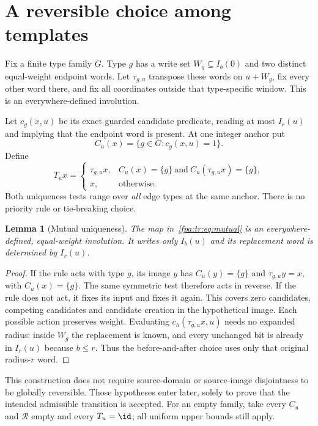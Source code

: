 \documentclass[11pt,a4paper]{article}
\numberwithin{equation}{section}
\newtheorem{lemma}[theorem]{Lemma}
\newcommand{\Rec}{\mathcal R}\newcommand{\Sel}{\mathcal S}
\begin{document}
\section{A reversible choice among templates}\label{fpa:tr:sec:choice}
Fix a finite type family $G$. Type $g$ has a write set $W_g\subseteq I_b(0)$ and two distinct equal-weight endpoint words. Let $\tau_{g,u}$ transpose these words on $u+W_g$, fix every other word there, and fix all coordinates outside that type-specific window. This is an everywhere-defined involution.

Let $c_g(x,u)$ be its exact guarded candidate predicate, reading at most $I_r(u)$ and implying that the endpoint word is present. At one integer anchor put
\[
C_u(x)=\{g\in G:c_g(x,u)=1\}.
\]
Define
\begin{equation}\label{fpa:tr:eq:mutual}
T_u x=\begin{cases}
\tau_{g,u}x,&C_u(x)=\{g\}\ \text{and}\ C_u(\tau_{g,u}x)=\{g\},\\
x,&\text{otherwise}.
\end{cases}
\end{equation}
Both uniqueness tests range over \emph{all} edge types at the same anchor. There is no priority rule or tie-breaking choice.

\begin{lemma}[Mutual uniqueness]\label{fpa:tr:lem:mutual}
The map in~\eqref{fpa:tr:eq:mutual} is an everywhere-defined, equal-weight involution. It writes only $I_b(u)$ and its replacement word is determined by $I_r(u)$.
\end{lemma}
\begin{proof}
If the rule acts with type $g$, its image $y$ has $C_u(y)=\{g\}$ and $\tau_{g,u}y=x$, with $C_u(x)=\{g\}$. The same symmetric test therefore acts in reverse. If the rule does not act, it fixes its input and fixes it again. This covers zero candidates, competing candidates and candidate creation in the hypothetical image. Each possible action preserves weight. Evaluating $c_h(\tau_{g,u}x,u)$ needs no expanded radius: inside $W_g$ the replacement is known, and every unchanged bit is already in $I_r(u)$ because $b\le r$. Thus the before-and-after choice uses only that original radius-$r$ word.
\end{proof}

This construction does not require source-domain or source-image disjointness to be globally reversible. Those hypotheses enter later, solely to prove that the intended admissible transition is accepted. For an empty family, take every $C_u$ and $\Rec$ empty and every $T_u=\id$; all uniform upper bounds still apply.
\end{document}

